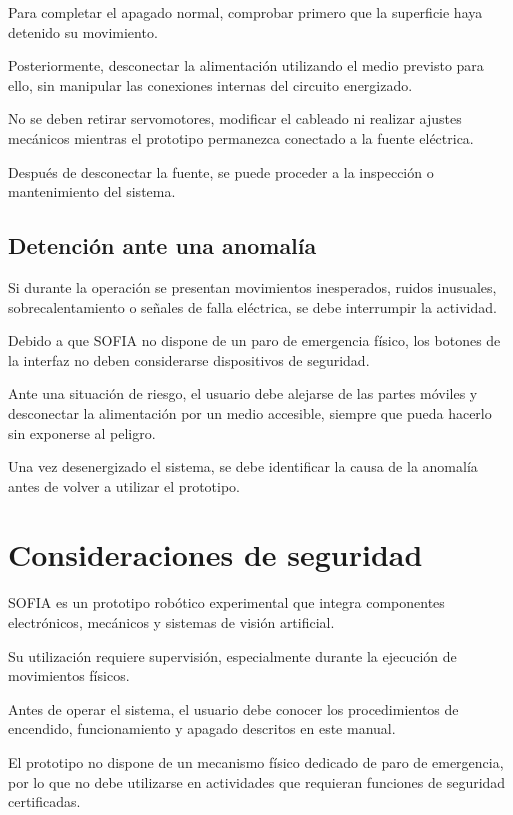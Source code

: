 \documentclass[letterpaper,journal]{IEEEtran}
\begin{document}
Para completar el apagado normal,
comprobar primero que la superficie
haya detenido su movimiento.

Posteriormente, desconectar
la alimentación utilizando
el medio previsto para ello,
sin manipular las conexiones
internas del circuito energizado.

No se deben retirar servomotores,
modificar el cableado ni realizar
ajustes mecánicos mientras
el prototipo permanezca conectado
a la fuente eléctrica.

Después de desconectar la fuente,
se puede proceder a la inspección
o mantenimiento del sistema.

\subsection{Detención ante una anomalía}

Si durante la operación se presentan
movimientos inesperados, ruidos
inusuales, sobrecalentamiento
o señales de falla eléctrica,
se debe interrumpir la actividad.

Debido a que SOFIA no dispone
de un paro de emergencia físico,
los botones de la interfaz
no deben considerarse
dispositivos de seguridad.

Ante una situación de riesgo,
el usuario debe alejarse
de las partes móviles y
desconectar la alimentación
por un medio accesible,
siempre que pueda hacerlo
sin exponerse al peligro.

Una vez desenergizado el sistema,
se debe identificar la causa
de la anomalía antes de volver
a utilizar el prototipo.

\section{Consideraciones de seguridad}
\label{sec:seguridad}

SOFIA es un prototipo robótico experimental
que integra componentes electrónicos,
mecánicos y sistemas de visión artificial.

Su utilización requiere supervisión,
especialmente durante la ejecución
de movimientos físicos.

Antes de operar el sistema, el usuario
debe conocer los procedimientos de
encendido, funcionamiento y apagado
descritos en este manual.

El prototipo no dispone de un mecanismo
físico dedicado de paro de emergencia,
por lo que no debe utilizarse en
actividades que requieran funciones
de seguridad certificadas.
\end{document}
